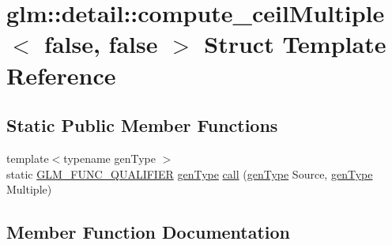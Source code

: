 \hypertarget{structglm_1_1detail_1_1compute__ceil_multiple_3_01false_00_01false_01_4}{}\section{glm\+:\+:detail\+:\+:compute\+\_\+ceil\+Multiple$<$ false, false $>$ Struct Template Reference}
\label{structglm_1_1detail_1_1compute__ceil_multiple_3_01false_00_01false_01_4}
\subsection*{Static Public Member Functions}
\begin{DoxyCompactItemize}
\item 
{\footnotesize template$<$typename gen\+Type $>$ }\\static \mbox{\hyperlink{setup_8hpp_a33fdea6f91c5f834105f7415e2a64407}{G\+L\+M\+\_\+\+F\+U\+N\+C\+\_\+\+Q\+U\+A\+L\+I\+F\+I\+ER}} \mbox{\hyperlink{structglm_1_1detail_1_1gen_type}{gen\+Type}} \mbox{\hyperlink{structglm_1_1detail_1_1compute__ceil_multiple_3_01false_00_01false_01_4_a42251f23ffbe25b624948a1128aa9957}{call}} (\mbox{\hyperlink{structglm_1_1detail_1_1gen_type}{gen\+Type}} Source, \mbox{\hyperlink{structglm_1_1detail_1_1gen_type}{gen\+Type}} Multiple)
\end{DoxyCompactItemize}


\subsection{Member Function Documentation}
\mbox{\label{structglm_1_1detail_1_1compute__ceil_multiple_3_01false_00_01false_01_4_a42251f23ffbe25b624948a1128aa9957}} 
